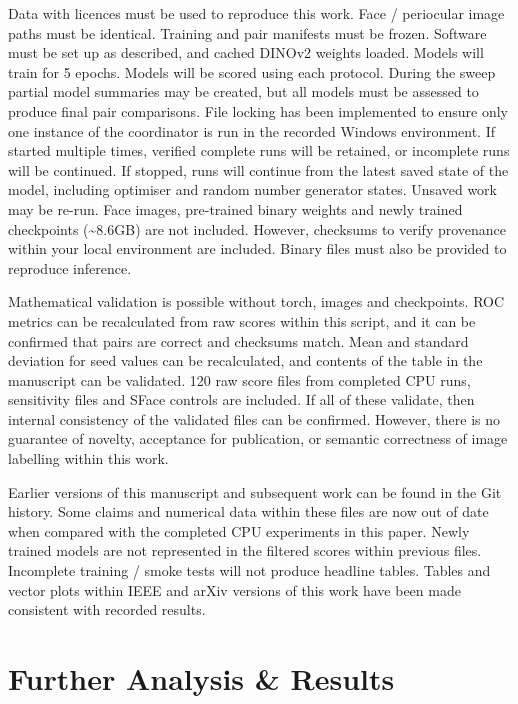 \documentclass[10pt,lettersize,journal]{IEEEtran}
\begin{document}
Data with licences must be used to reproduce this work. Face / periocular image paths must be identical. Training and pair manifests must be frozen. Software must be set up as described, and cached DINOv2 weights loaded. Models will train for 5 epochs. Models will be scored using each protocol. During the sweep partial model summaries may be created, but all models must be assessed to produce final pair comparisons. File locking has been implemented to ensure only one instance of the coordinator is run in the recorded Windows environment. If started multiple times, verified complete runs will be retained, or incomplete runs will be continued. If stopped, runs will continue from the latest saved state of the model, including optimiser and random number generator states. Unsaved work may be re-run. Face images, pre-trained binary weights and newly trained checkpoints (\textasciitilde{}8.6GB) are not included. However, checksums to verify provenance within your local environment are included. Binary files must also be provided to reproduce inference.\par

Mathematical validation is possible without torch, images and checkpoints. ROC metrics can be recalculated from raw scores within this script, and it can be confirmed that pairs are correct and checksums match. Mean and standard deviation for seed values can be recalculated, and contents of the table in the manuscript can be validated. 120 raw score files from completed CPU runs, sensitivity files and SFace controls are included. If all of these validate, then internal consistency of the validated files can be confirmed. However, there is no guarantee of novelty, acceptance for publication, or semantic correctness of image labelling within this work.\par

Earlier versions of this manuscript and subsequent work can be found in the Git history. Some claims and numerical data within these files are now out of date when compared with the completed CPU experiments in this paper. Newly trained models are not represented in the filtered scores within previous files. Incomplete training / smoke tests will not produce headline tables. Tables and vector plots within IEEE and arXiv versions of this work have been made consistent with recorded results.\par

\section{Further Analysis \& Results}
\end{document}
